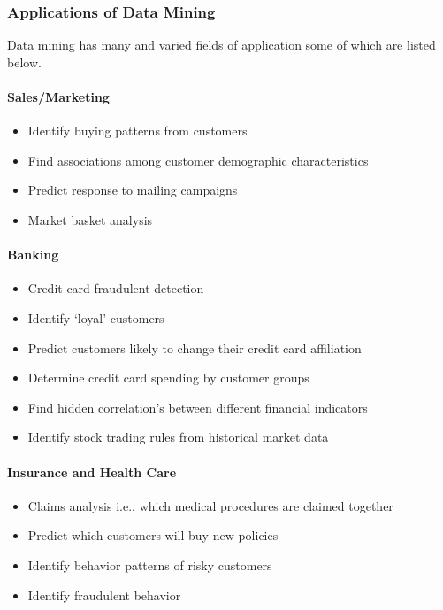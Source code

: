 \subsubsection*{Applications of Data Mining}
Data mining has many and varied fields of application some of which are listed below.

\paragraph*{Sales/Marketing}
\begin{itemize}
	\item Identify buying patterns from customers
	\item Find associations among customer demographic characteristics
	\item Predict response to mailing campaigns
	\item Market basket analysis
\end{itemize}

\paragraph*{Banking}
\begin{itemize}
	\item Credit card fraudulent detection
	\item Identify ‘loyal’ customers
	\item Predict customers likely to change their credit card affiliation
	\item Determine credit card spending by customer groups
	\item Find hidden correlation’s between different financial indicators
	\item Identify stock trading rules from historical market data
\end{itemize}

\paragraph*{Insurance and Health Care}
\begin{itemize}
	\item Claims analysis i.e., which medical procedures are claimed together
	\item Predict which customers will buy new policies
	\item Identify behavior patterns of risky customers
	\item Identify fraudulent behavior
\end{itemize}

